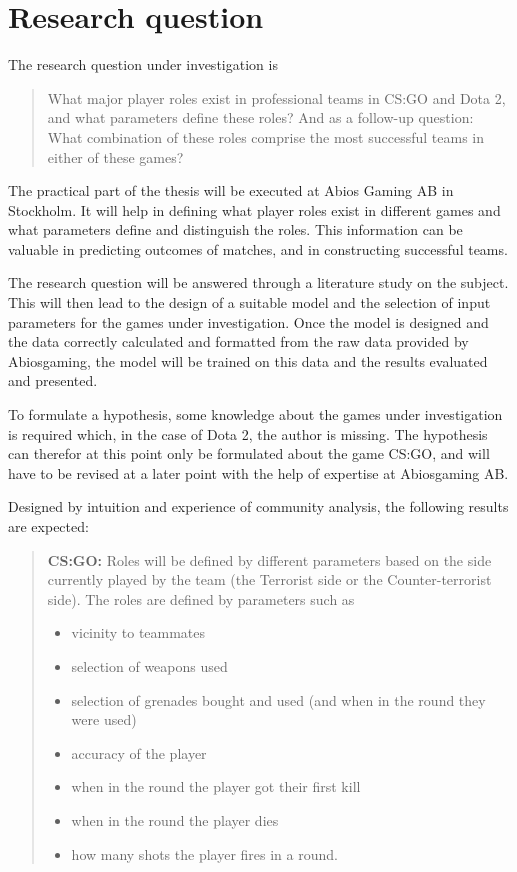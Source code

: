 \documentclass{article}
\begin{document}
\section{Research question}
The research question under investigation is
\begin{quote}
    What major player roles exist in professional teams in CS:GO and Dota 2, and what parameters define these roles? And as a follow-up question: What combination of these roles comprise the most successful teams in either of these games?
\end{quote}

The practical part of the thesis will be executed at Abios Gaming AB in Stockholm. It will help in defining what player roles exist in different games and what parameters define and distinguish the roles. This information can be valuable in predicting outcomes of matches, and in constructing successful teams.

The research question will be answered through a literature study on the subject. This will then lead to the design of a suitable model and the selection of input parameters for the games under investigation. Once the model is designed and the data correctly calculated and formatted from the raw data provided by Abiosgaming, the model will be trained on this data and the results evaluated and presented.

To formulate a hypothesis, some knowledge about the games under investigation is required which, in the case of Dota 2, the author is missing. The hypothesis can therefor at this point only be formulated about the game CS:GO, and will have to be revised at a later point with the help of expertise at Abiosgaming AB.

Designed by intuition and experience of community analysis, the following results are expected:
\begin{quote}
    {\bf CS:GO:} Roles will be defined by different parameters based on the side currently played by the team (the Terrorist side or the Counter-terrorist side). The roles are defined by parameters such as
    \begin{itemize}
        \item vicinity to teammates
        \item selection of weapons used
        \item selection of grenades bought and used (and when in the round they were used)
        \item accuracy of the player
        \item when in the round the player got their first kill
        \item when in the round the player dies
        \item how many shots the player fires in a round.
    \end{itemize}
\end{quote}
\end{document}
